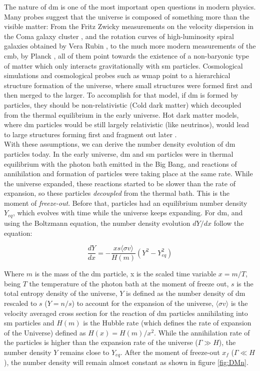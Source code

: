 \documentclass[main.tex]{subfiles}
\begin{document}
The nature of \gls{dm} is one of the most important open questions in modern physics. Many probes suggest that the universe is composed of something more than the visible matter: From the Fritz Zwicky measurements on the velocity dispersion in the Coma galaxy cluster \cite{Zwicky}, and the rotation curves of high-luminosity spiral galaxies obtained by Vera Rubin \cite{1978Rubin}, to the much more modern measurements of the \gls{cmb}, by Planck \cite{2014Planck}, all of them point towards the existence of a non-baryonic type of matter which only interacts gravitationally with \gls{sm} particles. Cosmological simulations and cosmological probes such as \gls{wmap} point to a hierarchical structure formation of the universe, where small structures were formed first and then merged to the larger. To accomplish for that model, if \gls{dm} is formed by particles, they should be non-relativistic (Cold dark matter) which decoupled from the thermal equilibrium in the early universe. Hot dark matter models, where \gls{dm} particles would be still largely relativistic (like neutrinos), would lead to large structures forming first and fragment out later \cite{2003Olive}. \\
With these assumptions, we can derive the number density evolution of \gls{dm} particles today. In the early universe, \gls{dm} and \gls{sm} particles were in thermal equilibrium with the photon bath emitted in the Big Bang, and reactions of annihilation and formation of particles were taking place at the same rate. While the universe expanded, these reactions started to be slower than the rate of expansion, so these particles \textit{decoupled} from the thermal bath. This is the moment of \textit{freeze-out}. Before that, particles had an equilibrium number density $Y_{eq}$, which evolves with time while the universe keeps expanding. For \gls{dm}, and using the Boltzmann equation, the number density evolution $dY/dx$ follow the equation:

\begin{equation}
    \frac{dY}{dx} = -\frac{xs\langle\sigma v\rangle}{H(m)}(Y^{2}-Y^{2}_{eq})
    \label{eq:dmabundance}
\end{equation}

Where $m$ is the mass of the \gls{dm} particle, x is the scaled time variable $x=m/T$, being $T$ the temperature of the photon bath at the moment of freeze out, $s$ is the total entropy density of the universe, $Y$ is defined as the number density of \gls{dm} rescaled to $s$ ($Y = n/s$) to account for the expansion of the universe, $\langle\sigma v\rangle$ is the velocity averaged cross section for the reaction of \gls{dm} particles annihilating into \gls{sm} particles and $H(m)$ is the Hubble rate (which defines the rate of expansion of the Universe) defined as $H(x) = H(m)/x^2$. While the annihilation rate of the particles is higher than the expansion rate of the universe ($\Gamma \gg H $), the number density $Y$ remains close to $Y_{eq}$. After the moment of freeze-out $x_f$ ($\Gamma \ll H$), the number density will remain almost constant as shown in figure \ref{fig:DMn}. 
\end{document}
